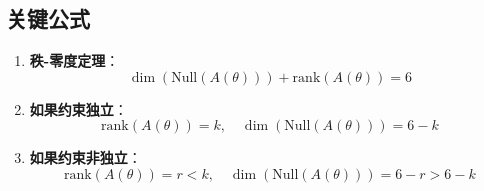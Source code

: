 \documentclass[12pt,a4paper]{article}
\begin{document}
\subsection{关键公式}

\begin{enumerate}
\item \textbf{秩-零度定理}：
\begin{equation}
\dim(\text{Null}(A(\theta))) + \text{rank}(A(\theta)) = 6
\end{equation}

\item \textbf{如果约束独立}：
\begin{equation}
\text{rank}(A(\theta)) = k, \quad \dim(\text{Null}(A(\theta))) = 6 - k
\end{equation}

\item \textbf{如果约束非独立}：
\begin{equation}
\text{rank}(A(\theta)) = r < k, \quad \dim(\text{Null}(A(\theta))) = 6 - r > 6 - k
\end{equation}
\end{enumerate}
\end{document}
